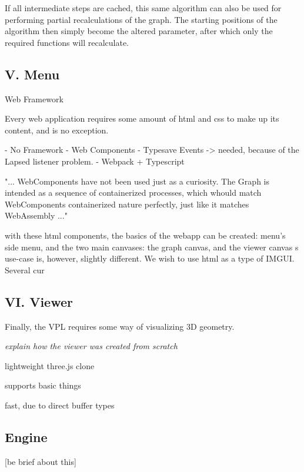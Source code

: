If all intermediate steps are cached, this same algorithm can also be used for performing partial recalculations of the graph. 
The starting positions of the algorithm then simply become the altered parameter, after which only the required functions will recalculate. 

\subsection{V. Menu}
Web Framework

Every web application requires some amount of html and css to make up its content, and \geofront{} is no exception. 


- No Framework
- Web Components
- Typesave Events -> needed, because of the Lapsed listener problem.
- Webpack + Typescript

"...
WebComponents have not been used just as a curiosity. 
The Graph is intended as a sequence of containerized processes, 
which whould match WebComponents containerized nature perfectly, just like it matches WebAssembly
..."

with these html components, the basics of the webapp can be created: menu's side menu, and the two main canvases: the graph canvas, and the viewer canvas 
\geofront{}s use-case is, however, slightly different. We wish to use html as a type of IMGUI. Several cur




\subsection{VI. Viewer}
Finally, the VPL requires some way of visualizing 3D geometry. 
 
\emph{explain how the viewer was created from scratch}

lightweight three.js clone

supports basic things

fast, due to direct buffer types



\subsection{Engine}
[be brief about this]

